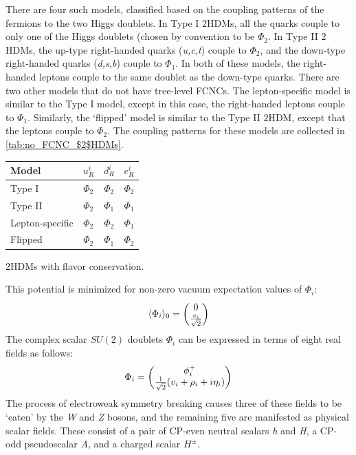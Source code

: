 There are four such models, classified based on the coupling patterns of the fermions to the two Higgs doublets. In Type I $2$HDMs, all the quarks couple to only one of the Higgs doublets (chosen by convention to be $\Phi_2$. In Type II $2$HDMs, the up-type right-handed quarks (\emph{u,c,t}) couple to $\Phi_2$, and the down-type right-handed quarks (\emph{d,s,b}) couple to $\Phi_1$. In both of these models, the right-handed leptons couple to the same doublet as the down-type quarks. There are two other models that do not have tree-level FCNCs. The lepton-specific model is similar to the Type I model, except in this case, the right-handed leptons couple to $\Phi_1$. Similarly, the `flipped' model is similar to the Type II $2$HDM, except that the leptons couple to $\Phi_2$. The coupling patterns for these models are collected in \autoref{tab:no_FCNC_$2$HDMs}.
\begin{margintable}[1cm]
\small{
  \begin{tabular}{lccc}
	\toprule
    Model & $u_R^i$ & $d_R^i$  & $e_R^i$\\
    \midrule
    Type I          & $\Phi_2$ & $\Phi_2$ & $\Phi_2$\\
    Type II         & $\Phi_2$ & $\Phi_1$ & $\Phi_1$\\
    Lepton-specific & $\Phi_2$ & $\Phi_2$ & $\Phi_1$\\
    Flipped         & $\Phi_2$ & $\Phi_1$ & $\Phi_2$\\
    \bottomrule
  \end{tabular}}
  \caption{$2$HDMs with flavor conservation.}
  \label{tab:no_FCNC_$2$HDMs}
\end{margintable}

This potential is minimized for non-zero vacuum expectation values of $\Phi_i$:
\begin{align}
\langle\Phi_i\rangle_0=\begin{pmatrix} 0 \\ \frac{v_i}{\sqrt{2}}\end{pmatrix}
\end{align}
The complex scalar $SU(2)$ doublets $\Phi_i$ can be expressed in terms of eight real fields as follows:
\begin{equation}\label{eq:2HDM_doublet_components}
\Phi_i = \begin{pmatrix} \phi_i^+ \\ \frac{1}{\sqrt{2}}(v_i+\rho_i+i\eta_i)\end{pmatrix}
\end{equation}
The process of electroweak symmetry breaking causes three of these fields to be `eaten' by the \emph{W} and \emph{Z} bosons, and the remaining five are manifested as physical scalar fields. These consist of a pair of CP-even neutral scalars \emph{h} and \emph{H}, a CP-odd pseudoscalar \emph{A}, and a charged scalar $H^\pm$.

